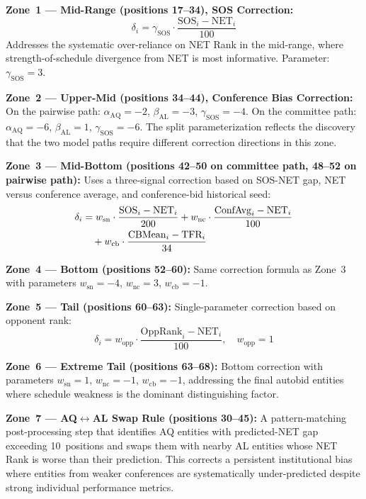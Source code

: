 \documentclass[conference]{IEEEtran}
\begin{document}
\textbf{Zone~1 --- Mid-Range (positions 17--34), SOS Correction:}
\begin{equation}
\delta_i = \gamma_{\text{SOS}} \cdot \frac{\text{SOS}_i - \text{NET}_i}{100}
\label{eq:zone1}
\end{equation}
Addresses the systematic over-reliance on NET Rank in the mid-range, where strength-of-schedule divergence from NET is most informative. Parameter: $\gamma_{\text{SOS}} = 3$.

\textbf{Zone~2 --- Upper-Mid (positions 34--44), Conference Bias Correction:}
On the pairwise path: $\alpha_{\text{AQ}} = -2$, $\beta_{\text{AL}} = -3$, $\gamma_{\text{SOS}} = -4$.
On the committee path: $\alpha_{\text{AQ}} = -6$, $\beta_{\text{AL}} = 1$, $\gamma_{\text{SOS}} = -6$.
The split parameterization reflects the discovery that the two model paths require different correction directions in this zone.

\textbf{Zone~3 --- Mid-Bottom (positions 42--50 on committee path, 48--52 on pairwise path):}
Uses a three-signal correction based on SOS-NET gap, NET versus conference average, and conference-bid historical seed:
\begin{align}
\delta_i &= w_{\text{sn}} \cdot \frac{\text{SOS}_i - \text{NET}_i}{200} + w_{\text{nc}} \cdot \frac{\text{ConfAvg}_i - \text{NET}_i}{100} \notag \\
&\quad + w_{\text{cb}} \cdot \frac{\text{CBMean}_i - \text{TFR}_i}{34}
\label{eq:zone3}
\end{align}

\textbf{Zone~4 --- Bottom (positions 52--60):} Same correction formula as Zone~3 with parameters $w_{\text{sn}} = -4$, $w_{\text{nc}} = 3$, $w_{\text{cb}} = -1$.

\textbf{Zone~5 --- Tail (positions 60--63):} Single-parameter correction based on opponent rank:
\begin{equation}
\delta_i = w_{\text{opp}} \cdot \frac{\text{OppRank}_i - \text{NET}_i}{100},\quad w_{\text{opp}} = 1
\label{eq:zone5}
\end{equation}

\textbf{Zone~6 --- Extreme Tail (positions 63--68):} Bottom correction with parameters $w_{\text{sn}} = 1$, $w_{\text{nc}} = -1$, $w_{\text{cb}} = -1$, addressing the final autobid entities where schedule weakness is the dominant distinguishing factor.

\textbf{Zone~7 --- AQ$\leftrightarrow$AL Swap Rule (positions 30--45):}
A pattern-matching post-processing step that identifies AQ entities with predicted-NET gap exceeding 10~positions and swaps them with nearby AL entities whose NET Rank is worse than their prediction. This corrects a persistent institutional bias where entities from weaker conferences are systematically under-predicted despite strong individual performance metrics.
\end{document}
